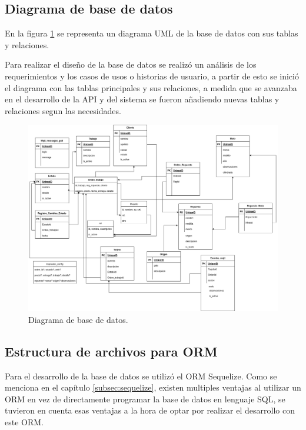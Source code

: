 \subsection{Diagrama de base de datos}
\label{subsec:diagramabasededatos}

En la figura \ref{fig:diagramabbdd} se representa un diagrama UML de la base de datos con sus tablas y relaciones.

Para realizar el diseño de la base de datos se realizó un análisis de los requerimientos y los casos de usos o historias de usuario, a partir de esto se inició el diagrama con las tablas principales y sus relaciones, a medida que se avanzaba en el desarrollo de la API y del sistema  se fueron añadiendo nuevas tablas y relaciones segun las necesidades. 

\begin{figure}[h]
	\centering
	\includegraphics[scale=.15]{./Figures/diagramabbdd.png}
	\caption{Diagrama de base de datos.}
	\label{fig:diagramabbdd}
\end{figure}

\subsection{Estructura de archivos para ORM}
\label{subsec:estructuraorm}
Para el desarrollo de la base de datos se utilizó el ORM Sequelize. Como se menciona en el capítulo \ref{subsec:sequelize}, existen multiples ventajas al utilizar un ORM en vez de directamente programar la base de datos en lenguaje SQL, se tuvieron en cuenta esas ventajas a la hora de optar por realizar el desarrollo con este ORM. 

